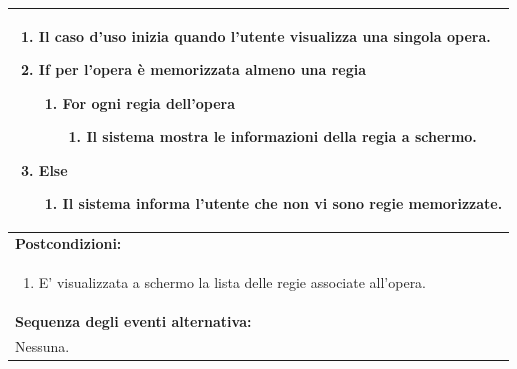 \documentclass{article}
\begin{document}
\begin{table}[H]
\begin{tabular}{|p{\linewidth}|}
                        \begin{enumerate}
                            \item Il caso d'uso inizia quando l'utente visualizza una singola opera.
                            \item \textbf{If} per l'opera è memorizzata almeno una regia
                            \begin{enumerate}
                                \item \textbf{For} ogni regia dell'opera
                                \begin{enumerate}
                                    \item Il sistema mostra le informazioni della regia a schermo.
                                \end{enumerate}
                            \end{enumerate}
                            \item \textbf{Else}
                            \begin{enumerate}
                                \item Il sistema informa l'utente che non vi sono regie memorizzate.
                            \end{enumerate}
                        \end{enumerate} \\
                        \hline
                        \cellcolor{gray!20}
                        \textbf{Postcondizioni:} \\
                        \cellcolor{gray!20}
                        \begin{minipage}{\linewidth}
                            \begin{enumerate}
                                \item E' visualizzata a schermo la lista delle regie associate all'opera.
                            \end{enumerate}
                        \end{minipage} \\
                        \hline
                        \textbf{Sequenza degli eventi alternativa:} \\
                        Nessuna. \\
                        \hline
                    \end{tabular}
                \end{table}
\end{document}
